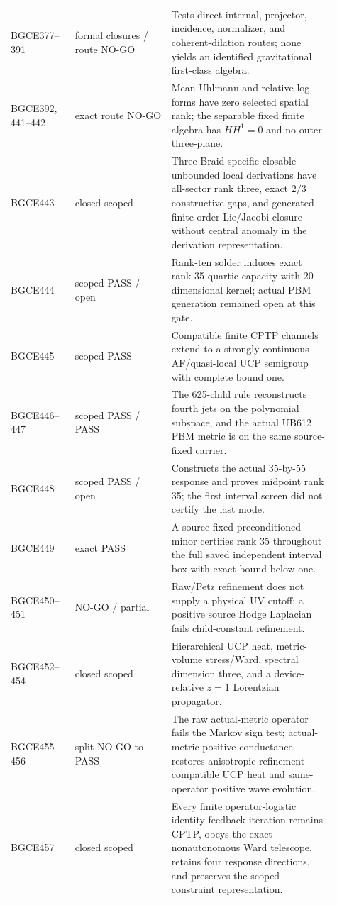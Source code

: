 \documentclass[11pt]{article}
\theoremstyle{definition}
\theoremstyle{remark}
\begin{document}
\begin{longtable}{>{\raggedright\arraybackslash}p{0.18\linewidth} >{\raggedright\arraybackslash}p{0.27\linewidth} >{\raggedright\arraybackslash}p{0.46\linewidth}}
BGCE377--391 & formal closures / route NO-GO & Tests direct internal, projector, incidence, normalizer, and coherent-dilation routes; none yields an identified gravitational first-class algebra. \\
BGCE392, 441--442 & exact route NO-GO & Mean Uhlmann and relative-log forms have zero selected spatial rank; the separable fixed finite algebra has $HH^1=0$ and no outer three-plane. \\
BGCE443 & closed scoped & Three Braid-specific closable unbounded local derivations have all-sector rank three, exact $2/3$ constructive gaps, and generated finite-order Lie/Jacobi closure without central anomaly in the derivation representation. \\
BGCE444 & scoped PASS / open & Rank-ten solder induces exact rank-35 quartic capacity with 20-dimensional kernel; actual PBM generation remained open at this gate. \\
BGCE445 & scoped PASS & Compatible finite CPTP channels extend to a strongly continuous AF/quasi-local UCP semigroup with complete bound one. \\
BGCE446--447 & scoped PASS / PASS & The 625-child rule reconstructs fourth jets on the polynomial subspace, and the actual UB612 PBM metric is on the same source-fixed carrier. \\
BGCE448 & scoped PASS / open & Constructs the actual 35-by-55 response and proves midpoint rank 35; the first interval screen did not certify the last mode. \\
BGCE449 & exact PASS & A source-fixed preconditioned minor certifies rank 35 throughout the full saved independent interval box with exact bound below one. \\
BGCE450--451 & NO-GO / partial & Raw/Petz refinement does not supply a physical UV cutoff; a positive source Hodge Laplacian fails child-constant refinement. \\
BGCE452--454 & closed scoped & Hierarchical UCP heat, metric-volume stress/Ward, spectral dimension three, and a device-relative $z=1$ Lorentzian propagator. \\
BGCE455--456 & split NO-GO to PASS & The raw actual-metric operator fails the Markov sign test; actual-metric positive conductance restores anisotropic refinement-compatible UCP heat and same-operator positive wave evolution. \\
BGCE457 & closed scoped & Every finite operator-logistic identity-feedback iteration remains CPTP, obeys the exact nonautonomous Ward telescope, retains four response directions, and preserves the scoped constraint representation. \\

\end{longtable}
\end{document}
